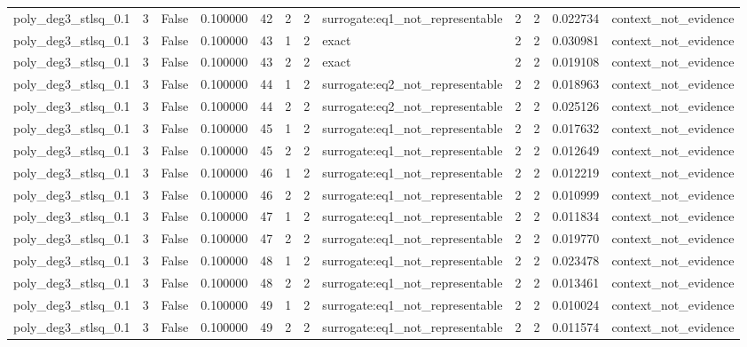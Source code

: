 \begin{tabular}{lrrrrrrlrrrl}
poly\_deg3\_stlsq\_0.1 & 3 & False & 0.100000 & 42 & 2 & 2 & surrogate:eq1\_not\_representable & 2 & 2 & 0.022734 & context\_not\_evidence \\
poly\_deg3\_stlsq\_0.1 & 3 & False & 0.100000 & 43 & 1 & 2 & exact & 2 & 2 & 0.030981 & context\_not\_evidence \\
poly\_deg3\_stlsq\_0.1 & 3 & False & 0.100000 & 43 & 2 & 2 & exact & 2 & 2 & 0.019108 & context\_not\_evidence \\
poly\_deg3\_stlsq\_0.1 & 3 & False & 0.100000 & 44 & 1 & 2 & surrogate:eq2\_not\_representable & 2 & 2 & 0.018963 & context\_not\_evidence \\
poly\_deg3\_stlsq\_0.1 & 3 & False & 0.100000 & 44 & 2 & 2 & surrogate:eq2\_not\_representable & 2 & 2 & 0.025126 & context\_not\_evidence \\
poly\_deg3\_stlsq\_0.1 & 3 & False & 0.100000 & 45 & 1 & 2 & surrogate:eq1\_not\_representable & 2 & 2 & 0.017632 & context\_not\_evidence \\
poly\_deg3\_stlsq\_0.1 & 3 & False & 0.100000 & 45 & 2 & 2 & surrogate:eq1\_not\_representable & 2 & 2 & 0.012649 & context\_not\_evidence \\
poly\_deg3\_stlsq\_0.1 & 3 & False & 0.100000 & 46 & 1 & 2 & surrogate:eq1\_not\_representable & 2 & 2 & 0.012219 & context\_not\_evidence \\
poly\_deg3\_stlsq\_0.1 & 3 & False & 0.100000 & 46 & 2 & 2 & surrogate:eq1\_not\_representable & 2 & 2 & 0.010999 & context\_not\_evidence \\
poly\_deg3\_stlsq\_0.1 & 3 & False & 0.100000 & 47 & 1 & 2 & surrogate:eq1\_not\_representable & 2 & 2 & 0.011834 & context\_not\_evidence \\
poly\_deg3\_stlsq\_0.1 & 3 & False & 0.100000 & 47 & 2 & 2 & surrogate:eq1\_not\_representable & 2 & 2 & 0.019770 & context\_not\_evidence \\
poly\_deg3\_stlsq\_0.1 & 3 & False & 0.100000 & 48 & 1 & 2 & surrogate:eq1\_not\_representable & 2 & 2 & 0.023478 & context\_not\_evidence \\
poly\_deg3\_stlsq\_0.1 & 3 & False & 0.100000 & 48 & 2 & 2 & surrogate:eq1\_not\_representable & 2 & 2 & 0.013461 & context\_not\_evidence \\
poly\_deg3\_stlsq\_0.1 & 3 & False & 0.100000 & 49 & 1 & 2 & surrogate:eq1\_not\_representable & 2 & 2 & 0.010024 & context\_not\_evidence \\
poly\_deg3\_stlsq\_0.1 & 3 & False & 0.100000 & 49 & 2 & 2 & surrogate:eq1\_not\_representable & 2 & 2 & 0.011574 & context\_not\_evidence \\

\end{tabular}
